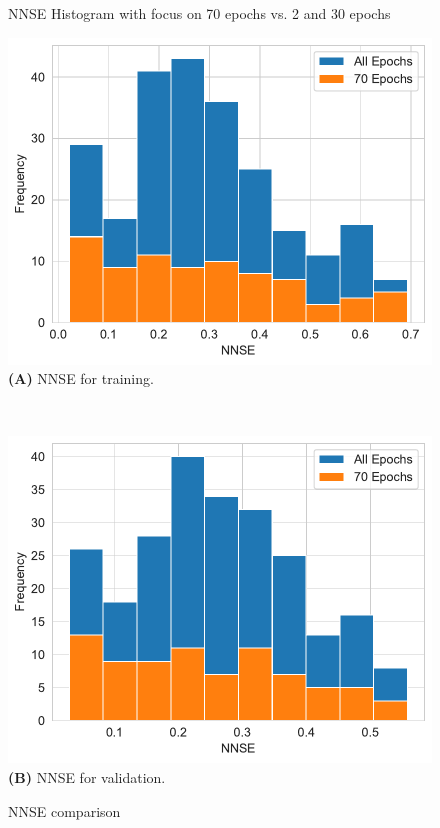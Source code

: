 \documentclass[utf8]{FrontiersinVancouver} %
\begin{document}
\begin{figure}[p]
  \caption {NNSE Histogram with focus on 70 epochs vs. 2 and 30 epochs}
  \label{fig:NNSE-comparison-a100}

\end{figure}

\begin{figure}[p]

  \begin{center}
     \begin{minipage}[t]{0.65\textwidth}
        \includegraphics[width=1.0\linewidth]{images/frequency_nnse_histogram_70_training.pdf}
        {\bf (A)} NNSE for training.
     \end{minipage}
  \end{center}
  \ \
  \begin{center}
     \begin{minipage}[t]{0.65\textwidth}
        \includegraphics[width=1.0\linewidth]{images/frequency_nnse_histogram_70_validation.pdf}
        {\bf (B)} NNSE for validation.
     \end{minipage}
  \end{center}

  \caption {NNSE comparison}
  \label{fig:NNSE-history-a100}

\end{figure}
\end{document}

